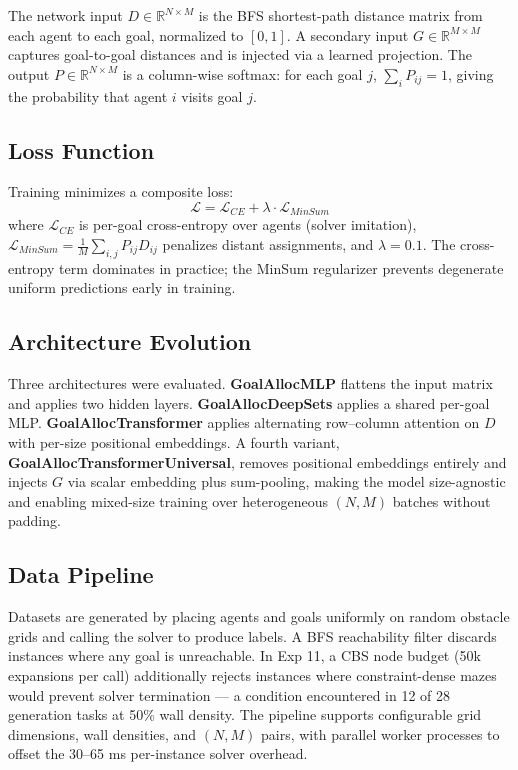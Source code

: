 \documentclass[11pt,a4paper]{article}
\begin{document}
The network input $D \in \mathbb{R}^{N \times M}$ is the BFS shortest-path distance matrix
from each agent to each goal, normalized to $[0,1]$. A secondary input $G \in \mathbb{R}^{M \times M}$
captures goal-to-goal distances and is injected via a learned projection. The output
$P \in \mathbb{R}^{N \times M}$ is a column-wise softmax: for each goal $j$,
$\sum_i P_{ij} = 1$, giving the probability that agent $i$ visits goal $j$.

\subsection{Loss Function}

Training minimizes a composite loss:
\[
\mathcal{L} = \mathcal{L}_{CE} + \lambda \cdot \mathcal{L}_{MinSum}
\]
\noindent where $\mathcal{L}_{CE}$ is per-goal cross-entropy over agents (solver imitation),
$\mathcal{L}_{MinSum} = \frac{1}{M}\sum_{i,j} P_{ij} D_{ij}$ penalizes distant assignments,
and $\lambda = 0.1$. The cross-entropy term dominates in practice; the MinSum regularizer
prevents degenerate uniform predictions early in training.

\subsection{Architecture Evolution}

Three architectures were evaluated. \textbf{GoalAllocMLP} flattens the input matrix and applies
two hidden layers. \textbf{GoalAllocDeepSets} applies a shared per-goal MLP.
\textbf{GoalAllocTransformer} applies alternating row--column attention on $D$ with per-size
positional embeddings. A fourth variant, \textbf{GoalAllocTransformerUniversal}, removes
positional embeddings entirely and injects $G$ via scalar embedding plus sum-pooling, making
the model size-agnostic and enabling mixed-size training over heterogeneous $(N,M)$ batches
without padding.

\subsection{Data Pipeline}

Datasets are generated by placing agents and goals uniformly on random obstacle grids and calling
the solver to produce labels. A BFS reachability filter discards instances where any goal is
unreachable. In Exp 11, a CBS node budget (50k expansions per call) additionally rejects
instances where constraint-dense mazes would prevent solver termination --- a condition encountered
in 12 of 28 generation tasks at 50\% wall density. The pipeline supports configurable grid
dimensions, wall densities, and $(N,M)$ pairs, with parallel worker processes to offset the
30--65 ms per-instance solver overhead.
\end{document}
